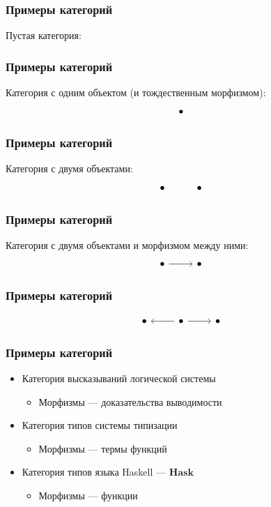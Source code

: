 \documentclass{beamer}
\begin{document}
\begin{frame}[fragile]
\frametitle{Примеры категорий}
Пустая категория:
\end{frame}

\begin{frame}[fragile]
\frametitle{Примеры категорий}
Категория с одним объектом (и тождественным морфизмом):
\begin{equation}
\begin{tikzcd}
\bullet
\end{tikzcd}
\end{equation}
\end{frame}

\begin{frame}[fragile]
\frametitle{Примеры категорий}
Категория с двумя объектами:
\begin{equation}
\begin{tikzcd}
\bullet & \bullet
\end{tikzcd}
\end{equation}
\end{frame}

\begin{frame}[fragile]
\frametitle{Примеры категорий}
Категория с двумя объектами и морфизмом между ними:
\begin{equation}
\begin{tikzcd}
\bullet \arrow{r} & \bullet
\end{tikzcd}
\end{equation}
\end{frame}

\begin{frame}[fragile]
\frametitle{Примеры категорий}
\begin{equation}
\begin{tikzcd}
\bullet & \bullet \arrow{l} \arrow{r} & \bullet
\end{tikzcd}
\end{equation}
\end{frame}

\begin{frame}
\frametitle{Примеры категорий}
\begin{itemize}
\item Категория высказываний логической системы
\begin{itemize}
\item Морфизмы --- доказательства выводимости
\end{itemize}
\pause
\item Категория типов системы типизации
\begin{itemize}
\item Морфизмы --- термы функций
\end{itemize}
\pause
\item Категория типов языка Haskell --- \begin{math}\mathbf{Hask}\end{math}
\begin{itemize}
\item Морфизмы --- функции
\end{itemize}
\end{itemize}
\end{frame}
\end{document}
